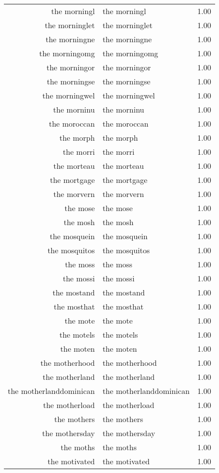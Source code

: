 \begin{table}[ht]
\begin{tabular}{rlr}
  the morningl & the morningl & 1.00 \\ 
  the morninglet & the morninglet & 1.00 \\ 
  the morningne & the morningne & 1.00 \\ 
  the morningomg & the morningomg & 1.00 \\ 
  the morningor & the morningor & 1.00 \\ 
  the morningse & the morningse & 1.00 \\ 
  the morningwel & the morningwel & 1.00 \\ 
  the morninu & the morninu & 1.00 \\ 
  the moroccan & the moroccan & 1.00 \\ 
  the morph & the morph & 1.00 \\ 
  the morri & the morri & 1.00 \\ 
  the morteau & the morteau & 1.00 \\ 
  the mortgage & the mortgage & 1.00 \\ 
  the morvern & the morvern & 1.00 \\ 
  the mose & the mose & 1.00 \\ 
  the mosh & the mosh & 1.00 \\ 
  the mosquein & the mosquein & 1.00 \\ 
  the mosquitos & the mosquitos & 1.00 \\ 
  the moss & the moss & 1.00 \\ 
  the mossi & the mossi & 1.00 \\ 
  the mostand & the mostand & 1.00 \\ 
  the mosthat & the mosthat & 1.00 \\ 
  the mote & the mote & 1.00 \\ 
  the motels & the motels & 1.00 \\ 
  the moten & the moten & 1.00 \\ 
  the motherhood & the motherhood & 1.00 \\ 
  the motherland & the motherland & 1.00 \\ 
  the motherlanddominican & the motherlanddominican & 1.00 \\ 
  the motherload & the motherload & 1.00 \\ 
  the mothers & the mothers & 1.00 \\ 
  the mothersday & the mothersday & 1.00 \\ 
  the moths & the moths & 1.00 \\ 
  the motivated & the motivated & 1.00 \\ 

\end{tabular}
\end{table}
